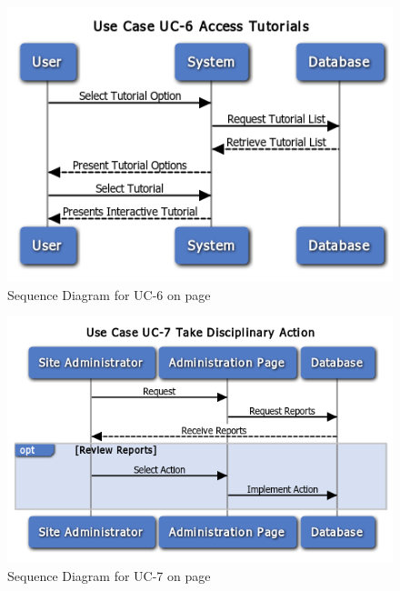 \begin{figure}
\centering
\includegraphics[width=5.5in]{./Diagrams/SystemSequenceDiagrams/uc6.png}
\caption{Sequence Diagram for UC-6 on page \pageref{UC-6}}
\end{figure}

\begin{figure}
\centering
\includegraphics[width=5.5in]{./Diagrams/SystemSequenceDiagrams/uc7.png}
\caption{Sequence Diagram for UC-7 on page \pageref{UC-7}}
\end{figure}
